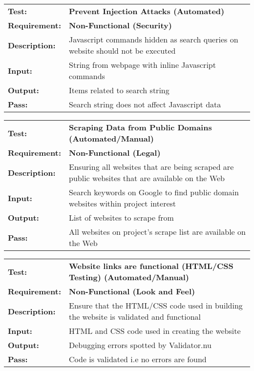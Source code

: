 \documentclass{article}
\begin{document}
	\begin{mdframed}[linewidth=1pt]
	\begin{tabularx}{\textwidth}{@{}p{3cm}X@{}}
	{\bf Test:} & {\bf Prevent Injection Attacks (Automated)}\\[\baselineskip]
	{\bf Requirement:} & {\bf Non-Functional (Security)}\\[\baselineskip]
	{\bf Description:} & Javascript commands hidden as search queries on website should not be executed\\[0.5\baselineskip]
	{\bf Input:} &  String from webpage with inline Javascript commands \\[0.5\baselineskip]
	{\bf Output:} & Items related to search string \\[0.5\baselineskip]
	{\bf Pass:} & Search string does not affect Javascript data
	\end{tabularx}
	\end{mdframed}



	\begin{mdframed}[linewidth=1pt]
	\begin{tabularx}{\textwidth}{@{}p{3cm}X@{}}
	{\bf Test:} & {\bf Scraping Data from Public Domains (Automated/Manual)}\\[\baselineskip]
	{\bf Requirement:} & {\bf Non-Functional (Legal)}\\[\baselineskip]
	{\bf Description:} & Ensuring all websites that are being scraped are public websites that are available on the Web\\[0.5\baselineskip]
	{\bf Input:} &  Search keywords on Google to find public domain websites within project interest\\[0.5\baselineskip]
	{\bf Output:} & List of websites to scrape from \\[0.5\baselineskip]
	{\bf Pass:} & All websites on project's scrape list are available on the Web
	\end{tabularx}
	\end{mdframed}


	\begin{mdframed}[linewidth=1pt]
	\begin{tabularx}{\textwidth}{@{}p{3cm}X@{}}
	{\bf Test:} & {\bf Website links are functional (HTML/CSS Testing) (Automated/Manual)}\\[\baselineskip]
	{\bf Requirement:} & {\bf Non-Functional (Look and Feel)}\\[\baselineskip]
	{\bf Description:} & Ensure that the HTML/CSS code used in building the website is validated and functional \\[0.5\baselineskip]
	{\bf Input:} & HTML and CSS code used in creating the website \\[0.5\baselineskip]
	{\bf Output:} & Debugging errors spotted by Validator.nu \\[0.5\baselineskip]
	{\bf Pass:} & Code is validated i.e no errors are found
	\end{tabularx}
	\end{mdframed}
\end{document}
